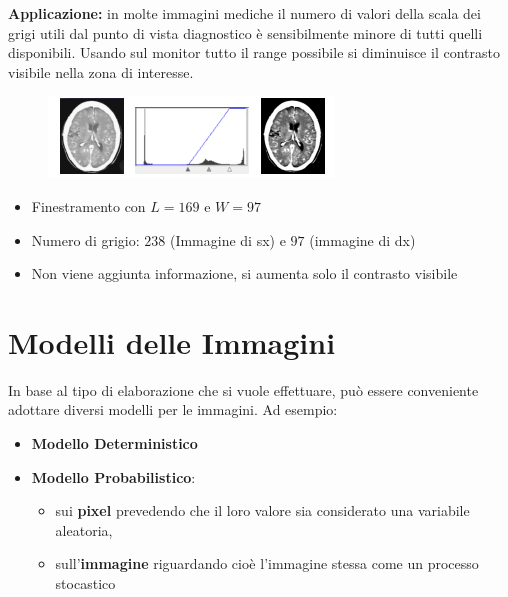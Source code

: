 \textbf{Applicazione:} in molte immagini mediche il numero di valori della
scala dei grigi utili dal punto di vista diagnostico è sensibilmente
minore di tutti quelli disponibili. Usando sul monitor tutto il range
possibile si diminuisce il contrasto visibile nella zona di interesse.

\begin{figure}[H]
    \centering
    \includegraphics[width=\linewidth, keepaspectratio]{capitoli/immagini/imgs/windowing.png}
\end{figure}

\begin{itemize}
    \item Finestramento con $L = 169$ e $W = 97$
    \item Numero di grigio: $238$ (Immagine di sx) e $97$ (immagine di dx)
    \item Non viene aggiunta informazione, si aumenta solo il contrasto visibile
\end{itemize}

\section{Modelli delle Immagini}

In base al tipo di elaborazione che si vuole effettuare, può essere conveniente adottare diversi modelli per le immagini. Ad esempio:

\begin{itemize}
    \item \textbf{Modello Deterministico}
    \item \textbf{Modello Probabilistico}:
          \begin{itemize}
              \item sui \textbf{pixel} prevedendo che il loro valore sia
                    considerato una variabile aleatoria,
              \item sull'\textbf{immagine} riguardando cioè l'immagine stessa
                    come un processo stocastico

          \end{itemize}
\end{itemize}


